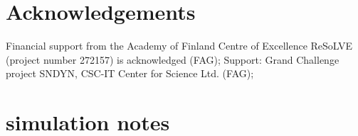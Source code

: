 \documentclass[iop,apj,numberedappendix,twocolappendix]{emulateapj}
\begin{document}
\section*{Acknowledgements}
  Financial support from the Academy of Finland Centre of Excellence ReSoLVE 
  (project number 272157) is acknowledged (FAG); 
  Support: Grand Challenge project SNDYN, CSC-IT Center for Science Ltd. (FAG); 


\newpage 

\appendix

\section*{simulation notes}
\end{document}
